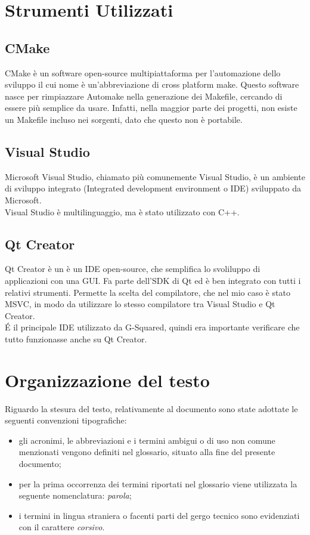 \newpage
\section{Strumenti Utilizzati}
\subsection{CMake}\label{sec:cmake}
CMake è un software open-source multipiattaforma per l'automazione dello sviluppo il cui nome è un'abbreviazione di cross platform make. Questo software nasce per rimpiazzare Automake nella generazione dei Makefile, cercando di essere più semplice da usare. Infatti, nella maggior parte dei progetti, non esiste un Makefile incluso nei sorgenti, dato che questo non è portabile.

\subsection{Visual Studio}\label{sec:visual-studio}
Microsoft Visual Studio, chiamato più comunemente Visual Studio, è un ambiente di sviluppo integrato (Integrated development environment o IDE) sviluppato da Microsoft.
\\
Visual Studio è multilinguaggio, ma è stato utilizzato con C++.

\subsection{Qt Creator}\label{sec:qt-creator}
Qt Creator è un è un IDE open-source, che semplifica lo svoliluppo di applicazioni con una GUI. Fa parte dell'SDK di Qt ed è ben integrato con tutti i relativi strumenti. Permette la scelta del compilatore, che nel mio caso è stato MSVC, in modo da utilizzare lo stesso compilatore tra Visual Studio e Qt Creator.
\\
\'E il principale IDE utilizzato da G-Squared, quindi era importante verificare che tutto funzionasse anche su Qt Creator.

\section{Organizzazione del testo}

Riguardo la stesura del testo, relativamente al documento sono state adottate le seguenti convenzioni tipografiche:
\begin{itemize}
	\item gli acronimi, le abbreviazioni e i termini ambigui o di uso non comune menzionati vengono definiti nel glossario, situato alla fine del presente documento;
	\item per la prima occorrenza dei termini riportati nel glossario viene utilizzata la seguente nomenclatura: \emph{parola}\glsfirstoccur;
	\item i termini in lingua straniera o facenti parti del gergo tecnico sono evidenziati con il carattere \emph{corsivo}.
\end{itemize}